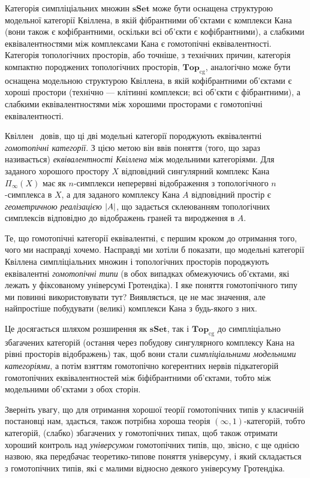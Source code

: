 \documentclass[12pt]{article}
\newcommand*{\inftyone}{\ensuremath{(\infty,1)}}
\newcommand*{\sSet}{\ensuremath{\mathbf{sSet}}}
\newcommand*{\cgTop}{\ensuremath{\mathbf{Top}_{\mathrm{cg}}}}
\DeclarePairedDelimiter\abs{\lvert}{\rvert} %
\begin{document}
Категорія симпліціальних множин $\sSet$ може бути оснащена структурою модельної категорії Квіллена, в якій фібрантними об'єктами є комплекси Кана (вони також є кофібрантними, оскільки всі об'єкти є кофібрантними), а слабкими еквівалентностями між комплексами Кана є гомотопічні еквівалентності. Категорія топологічних просторів, або точніше, з технічних причин, категорія компактно породжених топологічних просторів, $\cgTop$, аналогічно може бути оснащена модельною структурою Квіллена, в якій кофібрантними об'єктами є хороші простори (технічно — клітинні комплекси; всі об'єкти є фібрантними), а слабкими еквівалентностями між хорошими просторами є гомотопічні еквівалентності.

Квіллен~\cite{Quillen1967} довів, що ці дві модельні категорії породжують еквівалентні \emph{гомотопічні категорії}. З цією метою він ввів поняття (того, що зараз називається) \emph{еквівалентності Квіллена} між модельними категоріями. Для заданого хорошого простору $X$ відповідний сингулярний комплекс Кана $\Pi_\infty(X)$ має як $n$-симплекси неперервні відображення з топологічного $n$-симплекса в $X$, а для заданого комплексу Кана $A$ відповідний простір є \emph{геометричною реалізацією} $\abs A$, що задається склеюванням топологічних симплексів відповідно до відображень граней та виродження в $A$.

Те, що гомотопічні категорії еквівалентні, є першим кроком до отримання того, чого ми насправді хочемо. Насправді ми хотіли б показати, що модельні категорії Квіллена симпліціальних множин і топологічних просторів породжують еквівалентні \emph{гомотопічні типи} (в обох випадках обмежуючись об'єктами, які лежать у фіксованому універсумі Гротендіка). І яке поняття гомотопічного типу ми повинні використовувати тут? Виявляється, це не має значення, але найпростіше побудувати (великі) комплекси Кана з будь-якого з них.

Це досягається шляхом розширення як $\sSet$, так і $\cgTop$ до симпліціально збагачених категорій (остання через побудову сингулярного комплексу Кана на рівні просторів відображень) так, щоб вони стали \emph{симпліціальними модельними категоріями}, а потім взяттям гомотопічно когерентних нервів підкатегорій гомотопічних еквівалентностей між біфібрантними об'єктами, тобто між модельними об'єктами з обох сторін.

Зверніть увагу, що для отримання хорошої теорії гомотопічних типів у класичній постановці нам, здається, також потрібна хороша теорія \inftyone-категорій, тобто категорій, (слабко) збагачених у гомотопічних типах, щоб також отримати хороший контроль над \emph{універсумом} гомотопічних типів, що, звісно, є ще однією назвою, яка передбачає теоретико-типове поняття універсуму, і який складається з гомотопічних типів, які є малими відносно деякого універсуму Гротендіка.
\end{document}
